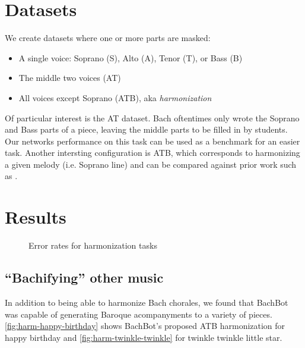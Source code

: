 \section{Datasets}

We create datasets where one or more parts are masked:
\begin{itemize}
  \item A single voice: Soprano (S), Alto (A), Tenor (T), or Bass (B)
  \item The middle two voices (AT)
  \item All voices except Soprano (ATB), aka \emph{harmonization}
\end{itemize}


Of particular interest is the AT dataset. Bach oftentimes only wrote the
Soprano and Bass parts of a piece, leaving the middle parts to be filled in by
students. Our networks performance on this task can be used as a benchmark for
an easier task. Another intersting configuration is ATB, which corresponds to
harmonizing a given melody (i.e. Soprano line) and can be compared against
prior work such as \citet{Allan2005}.

\section{Results}



\begin{figure}[tb]
  \centering
  
  \caption{Error rates for harmonization tasks}
  \label{fig:harmonization-results}
\end{figure}

\subsection{``Bachifying'' other music}

In addition to being able to harmonize Bach chorales, we found that BachBot was capable
of generating Baroque acompanyments to a variety of pieces. \cref{fig:harm-happy-birthday}
shows BachBot's proposed ATB harmonization for happy birthday
and \cref{fig:harm-twinkle-twinkle} for twinkle twinkle little star.


